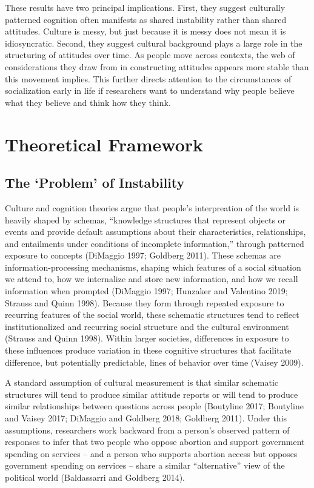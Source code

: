 \documentclass[12pt,]{article}
\begin{document}
These results have two principal implications. First, they suggest culturally patterned cognition often manifests as shared instability rather than shared attitudes. Culture is messy, but just because it is messy does not mean it is idiosyncratic. Second, they suggest cultural background plays a large role in the structuring of attitudes over time. As people move across contexts, the web of considerations they draw from in constructing attitudes appears more stable than this movement implies. This further directs attention to the circumstances of socialization early in life if researchers want to understand why people believe what they believe and think how they think.

\hypertarget{theoretical-framework}{%
\section{Theoretical Framework}\label{theoretical-framework}}

\hypertarget{the-problem-of-instability}{%
\subsection{The `Problem' of Instability}\label{the-problem-of-instability}}

Culture and cognition theories argue that people's interpreation of the world is heavily shaped by schemas, ``knowledge structures that represent objects or events and provide default assumptions about their characteristics, relationships, and entailments under conditions of incomplete information,'' through patterned exposure to concepts (DiMaggio 1997; Goldberg 2011). These schemas are information-processing mechanisms, shaping which features of a social situation we attend to, how we internalize and store new information, and how we recall information when prompted (DiMaggio 1997; Hunzaker and Valentino 2019; Strauss and Quinn 1998). Because they form through repeated exposure to recurring features of the social world, these schematic structures tend to reflect institutionalized and recurring social structure and the cultural environment (Strauss and Quinn 1998). Within larger societies, differences in exposure to these influences produce variation in these cognitive structures that facilitate difference, but potentially predictable, lines of behavior over time (Vaisey 2009).

A standard assumption of cultural measurement is that similar schematic structures will tend to produce similar attitude reports or will tend to produce similar relationships between questions across people (Boutyline 2017; Boutyline and Vaisey 2017; DiMaggio and Goldberg 2018; Goldberg 2011). Under this assumptions, researchers work backward from a person's observed pattern of responses to infer that two people who oppose abortion and support government spending on services -- and a person who supports abortion access but opposes government spending on services -- share a similar ``alternative'' view of the political world (Baldassarri and Goldberg 2014).
\end{document}

